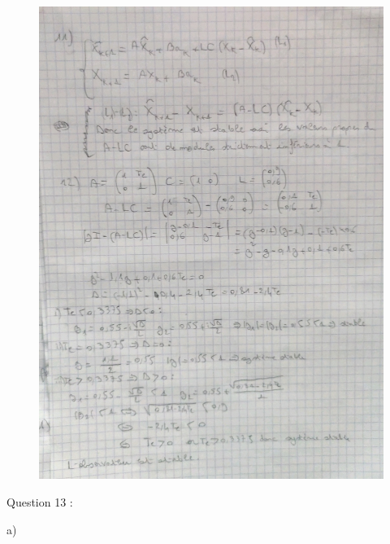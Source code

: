 \documentclass[14pt]{extarticle}
\begin{document}
\begin{figure} [tbh]
    \vspace{0.1cm}
        \centering
        \includegraphics[width=\columnwidth]{"images/q11_q12.jpg"}
    
    \end{figure}

\break

Question 13 :

\break 
a) 
\end{document}
